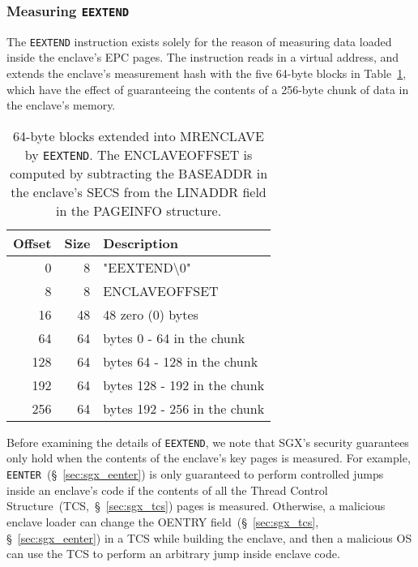 \subsubsection{Measuring \texttt{EEXTEND}}
\label{sec:sgx_eextend}


The \texttt{EEXTEND} instruction exists solely for the reason of measuring data
loaded inside the enclave's EPC pages. The instruction reads in a virtual
address, and extends the enclave's measurement hash with the five 64-byte
blocks in Table~\ref{fig:eextend_mrenclave}, which have the effect of
guaranteeing the contents of a 256-byte chunk of data in the enclave's memory.

\begin{table}[hbt]
  \centering
  \begin{tabularx}{\columnwidth}{| r | r | X |}
  \hline
  \textbf{Offset} & \textbf{Size} & \textbf{Description}\\
  \hline
  0 & 8 & "EEXTEND\textbackslash{}0" \\
  \hline
  8 & 8 & ENCLAVEOFFSET \\
  \hline
  16 & 48 & 48 zero (0) bytes \\
  \hline
  \hline
  64 & 64 & bytes 0 - 64 in the chunk \\
  \hline
  \hline
  128 & 64 & bytes 64 - 128 in the chunk \\
  \hline
  \hline
  192 & 64 & bytes 128 - 192 in the chunk \\
  \hline
  \hline
  256 & 64 & bytes 192 - 256 in the chunk \\
  \hline
  \end{tabularx}
  \caption{
    64-byte blocks extended into MRENCLAVE by \texttt{EEXTEND}. The
    ENCLAVEOFFSET is computed by subtracting the BASEADDR in the enclave's SECS
    from the LINADDR field in the PAGEINFO structure.
  }
  \label{fig:eextend_mrenclave}
\end{table}

Before examining the details of \texttt{EEXTEND}, we note that SGX's security
guarantees only hold when the contents of the enclave's key pages is measured.
For example, \texttt{EENTER}~(\S~\ref{sec:sgx_eenter}) is only guaranteed to
perform controlled jumps inside an enclave's code if the contents of all the
Thread Control Structure~(TCS,~\S~\ref{sec:sgx_tcs}) pages is measured.
Otherwise, a malicious enclave loader can change the OENTRY
field~(\S~\ref{sec:sgx_tcs}, \S~\ref{sec:sgx_eenter}) in a TCS while building
the enclave, and then a malicious OS can use the TCS to perform an arbitrary
jump inside enclave code.

